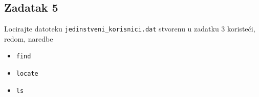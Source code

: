 \documentclass[12pt,a4paper]{article}
\begin{document}
  \subsection*{Zadatak 5}
  Locirajte datoteku \texttt{jedinstveni\_korisnici.dat} stvorenu u zadatku 3 koristeći, redom, naredbe
  \begin{itemize}
    \item \texttt{find}
    \item \texttt{locate}
    \item \texttt{ls}
  \end{itemize}
\end{document}
